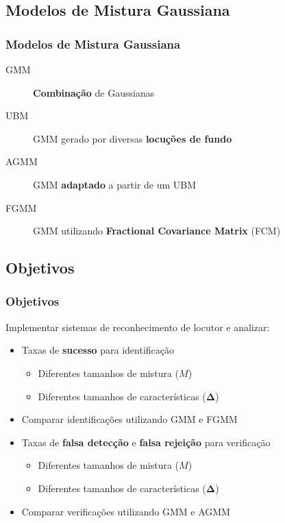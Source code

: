 \subsection{Modelos de Mistura Gaussiana}

\begin{frame}
\frametitle{Modelos de Mistura Gaussiana}
\begin{description}
    \item[GMM] \textbf{Combinação} de Gaussianas
    \pause
    \item[UBM] GMM gerado por diversas \textbf{locuções de fundo}
    \pause
    \item[AGMM] GMM \textbf{adaptado} a partir de um UBM
    \pause
    \item[FGMM] GMM utilizando \textbf{Fractional Covariance Matrix} (FCM)
\end{description}
\end{frame}

\subsection{Objetivos}

\begin{frame}
\frametitle{Objetivos}
\begin{description}
    \item Implementar sistemas de reconhecimento de locutor e analizar:
    \pause
    \begin{itemize}
        \item Taxas de \textbf{sucesso} para identificação
        \pause
        \begin{itemize}
            \item Diferentes tamanhos de mistura ($M$)
            \item Diferentes tamanhos de características ($\boldsymbol{\Delta}$)
            \pause
        \end{itemize}
        \item Comparar identificações utilizando GMM e FGMM
        \pause
        \item Taxas de \textbf{falsa detecção} e \textbf{falsa rejeição} para verificação
        \pause
        \begin{itemize}
            \item Diferentes tamanhos de mistura ($M$)
            \item Diferentes tamanhos de características ($\boldsymbol{\Delta}$)
            \pause
        \end{itemize}
        \item Comparar verificações utilizando GMM e AGMM
    \end{itemize}
\end{description}
\end{frame}